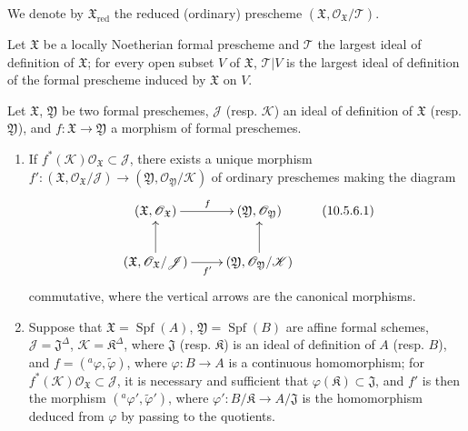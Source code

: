 We denote by $\mathfrak{X}_{\mathrm{red}}$ the reduced (ordinary)
prescheme $(\mathfrak{X},\mathscr{O}_{\mathfrak{X}}/\mathscr{T})$.

\begin{corollary}[10.5.5]
\label{I.10.5.5}
Let $\mathfrak{X}$ be a locally Noetherian formal prescheme and
$\mathscr{T}$ the largest ideal of definition of $\mathfrak{X}$; for
every open subset $V$ of $\mathfrak{X}$, $\mathscr{T}|V$ is the largest
ideal of definition of the formal prescheme induced by $\mathfrak{X}$ on
$V$.
\end{corollary}


\begin{proposition}[10.5.6]
\label{I.10.5.6}
Let $\mathfrak{X}$, $\mathfrak{Y}$ be two formal preschemes,
$\mathscr{J}$ \textup{(resp. $\mathscr{K}$)} an ideal of definition of
$\mathfrak{X}$ \textup{(resp. $\mathfrak{Y}$)}, and
$f:\mathfrak{X}\to\mathfrak{Y}$ a morphism of formal preschemes.
\begin{enumerate}
  \item[\rm{(i)}] If
    $f^*(\mathscr{K})\mathscr{O}_{\mathfrak{X}}\subset\mathscr{J}$,
    there exists a unique morphism
    $f':(\mathfrak{X},\mathscr{O}_{\mathfrak{X}}/\mathscr{J})\to
    (\mathfrak{Y},\mathscr{O}_{\mathfrak{Y}}/\mathscr{K})$ of
    ordinary preschemes making the diagram
    \[
      \label{I.10.5.6.1}
      \xymatrix{
        (\mathfrak{X},\mathscr{O}_{\mathfrak{X}})\ar[r]^f &
        (\mathfrak{Y},\mathscr{O}_{\mathfrak{Y}})\\
        (\mathfrak{X},\mathscr{O}_{\mathfrak{X}}/\mathscr{J})
          \ar[r]_{f'}\ar[u] &
        (\mathfrak{Y},\mathscr{O}_{\mathfrak{Y}}/\mathscr{K})\ar[u]
      }
      \tag{10.5.6.1}
    \]
    commutative, where the vertical arrows are the canonical morphisms.
  \item[\rm{(ii)}] Suppose that
    $\mathfrak{X}=\operatorname{Spf}(A)$,
    $\mathfrak{Y}=\operatorname{Spf}(B)$ are affine formal
    schemes, $\mathscr{J}=\mathfrak{J}^{\Delta}$,
    $\mathscr{K}=\mathfrak{K}^{\Delta}$, where $\mathfrak{J}$ \textup{(resp.
    $\mathfrak{K}$)} is an ideal of definition of $A$ \textup{(resp. $B$)}, and
    $f=({}^a\varphi,\widetilde{\varphi})$, where
    $\varphi:B\to A$ is a continuous homomorphism; for
    $f^*(\mathscr{K})\mathscr{O}_{\mathfrak{X}}\subset\mathscr{J}$,
    it is necessary and sufficient that
    $\varphi(\mathfrak{K})\subset\mathfrak{J}$, and $f'$ is then the
    morphism $({}^a\varphi',\widetilde{\varphi}')$, where
    $\varphi':B/\mathfrak{K}\to A/\mathfrak{J}$ is the homomorphism
    deduced from $\varphi$ by passing to the quotients.
\end{enumerate}
\end{proposition}

